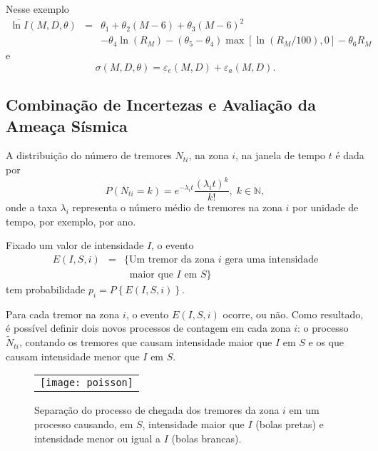 Nesse exemplo 
\begin{equation}
\begin{array}{lcl}
\overline{\ln I}(M, D, \theta) & = & \theta_1 + \theta_2(M-6) + \theta_3(M-6)^2  \\
& & - \theta_4\ln (R_M)
-(\theta_5 - \theta_4)\max\left[ \ln\left( R_M / 100 \right), 0 \right]
-\theta_6 R_M
\end{array}
\end{equation}
e 
\begin{equation}
	\sigma(M, D, \theta)=\varepsilon_e(M,D) + \varepsilon_a(M,D).
\end{equation}


\subsection{Combinação de Incertezas e Avaliação da Ameaça Sísmica}
\label{sec:hazard}

A distribuição do número de tremores $N_{t i}$, na zona $i$, na janela de tempo $t$
é dada por 
$$
P(N_{t i}=k)=e^{-\lambda_i t} \frac{(\lambda_i t)^k}{k!},\;k \in \mathbb{N},
$$
onde a taxa $\lambda_i$ representa o número médio de tremores na zona
$i$ por unidade de tempo, por exemplo, por ano.

Fixado um valor de intensidade $I$, o evento
\begin{equation} \label{formulapi}
\begin{array}{lll}
E(I, S, i)  & =  & \{ \mbox{Um tremor da zona }i \mbox{ gera uma intensidade} \\
&  &  \;\;\mbox{maior que } I \mbox{ em }S \}
\end{array}
\end{equation}
tem probabilidade $p_i=P \left\{ E(I, S, i)\right\}$.

Para cada tremor na zona $i$, o evento $E(I, S, i)$ ocorre, ou não.
Como resultado, é possível definir dois novos processos de contagem
em cada zona $i$: o processo $\tilde N_{t i}$, contando os tremores que 
causam intensidade maior que $I$ em $S$ e os que causam intensidade menor que $I$ em $S$.

\begin{figure}[H]
	\centering
	\begin{tabular}{l}
	\texttt{[image: poisson]}
	\end{tabular}
	\caption{Separação do processo de chegada dos tremores da zona $i$ 
	em um processo causando, em $S$, intensidade maior que $I$ (bolas pretas) e intensidade 
	menor ou igual a $I$ (bolas brancas).}
\label{fig:poisson}
\end{figure}

